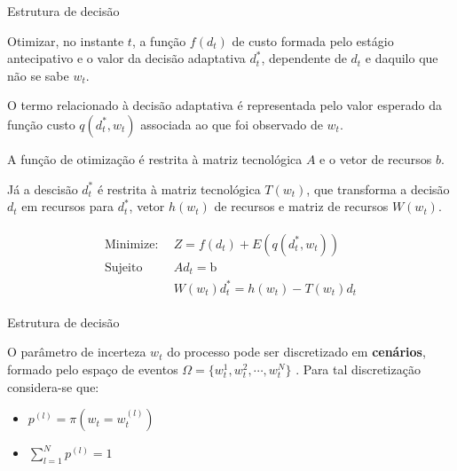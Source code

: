 \documentclass{beamer}
\begin{document}
\begin{frame}{Estrutura de decisão}

Otimizar, no instante $t$, a função $f(d_t)$ de custo formada pelo estágio antecipativo e o valor da decisão adaptativa $d_t^{*}$, dependente de $d_t$ e daquilo que não se sabe $w_t$.


O termo relacionado à decisão adaptativa é representada pelo valor esperado da função custo $q(d_t^{*},w_t)$ associada ao que foi observado de $w_t$.

A função de otimização é restrita à matriz tecnológica $A$ e o vetor de recursos $b$.

Já a descisão $d_t^{*}$ é restrita à matriz tecnológica $T(w_t)$, que transforma a decisão $d_t$ em recursos para $d_t^{*}$, vetor $h(w_t)$ de recursos e matriz de recursos $W(w_t)$. 



\begin{equation}
\begin{array}{cc}
\left. \begin{aligned}
\text{Minimize:} \ \ &Z = f(d_t)  + E\left(q(d_t^{*},w_t)\right) \ \\
\text{Sujeito} \ \ & A d_t = \text{b} \\
& W(w_t)d_t^{*} = h(w_t) - T(w_t)d_t
 \end{aligned}\right.
\end{array}
\label{eq:fob}
\end{equation}
\end{frame}



\begin{frame}{Estrutura de decisão}

O parâmetro de incerteza $w_t$ do processo pode ser discretizado em \textbf{cenários}, formado pelo espaço de eventos $\Omega = \{w_t^{1},w_t^{2},\cdots,w_t^{N}\}$ \citep{Kouwenberg2008}. Para tal discretização considera-se que:
\begin{itemize}
\item $p^{(l)} = \pi(w_t = w_t^{(l)})$
\item $\sum_{l=1}^N p^{(l)} = 1$
\end{itemize}
\end{frame}
\end{document}
